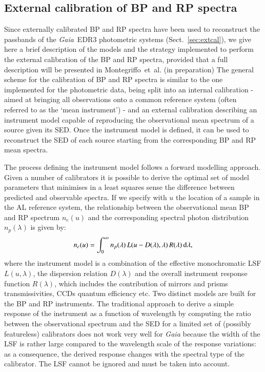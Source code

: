 \documentclass{aa}
\newcommand{\gaia}{\textit{Gaia}\xspace}
\newcommand{\edr}{\gaia~EDR3\xspace}
\newcommand{\xp}{BP and RP\xspace}
\newcommand{\citeip}[1]{#1~et~al. (in preparation)\xspace}
\newcommand{\secname}{Sect.}
\newcommand{\secref}[1]{\secname~\ref{sec:#1}}
\begin{document}

\begin{appendix} %



\section{External calibration of \xp spectra}\label{sec:extxpcal}

Since externally calibrated \xp spectra have been used to reconstruct the passbands of the \edr photometric systems (\secref{extcal}), we give here a brief description of the models and the strategy implemented to perform the external calibration of the \xp spectra, provided that a full description will be presented in \citeip{Montegriffo}
%
The general scheme for the calibration of \xp spectra is similar to the one implemented for the photometric data, being split into an internal calibration - aimed at bringing all observations onto a common reference system (often referred to as the `mean instrument') - and an external calibration describing an instrument model capable of reproducing the observational mean spectrum of a source given its SED. Once the instrument model is defined, it can be used to reconstruct the SED of each source starting from the corresponding \xp mean spectra. 

The process defining the instrument model follows a forward modelling approach.
Given a number of calibrators it is possible to derive the optimal set of model parameters that minimises in a least squares sense the difference between predicted and observable spectra.
If we specify with $u$ the location of a sample in the AL reference system, the relationship between the observational mean \xp spectrum $n_e(u)$ and the corresponding spectral photon distribution $n_p(\lambda)$ is given by:
\begin{equation}
\label{eq:extXpInstrumentModel}
n_{e}(u)=  \int_0^\infty n_p(\lambda) \, L(u - D(\lambda), \lambda) \, R(\lambda) \, {\rm d}\lambda,
\end{equation}
where the instrument model is a combination of the effective monochromatic LSF $L(u, \lambda)$, the dispersion relation $D(\lambda)$ and the overall instrument response function $R(\lambda)$, which includes the contribution of mirrors and prisms transmissivities, CCDs quantum efficiency etc.
Two distinct models are built for the BP and RP instruments.
The traditional approach to derive a simple response of the instrument as a function of wavelength by computing the ratio between the observational spectrum and the SED for a limited set of (possibly featureless) calibrators does not work very well for \gaia because the width of the LSF is rather large compared to the wavelength scale of the response variations: as a consequence, the derived response changes with the spectral type of the calibrator. The LSF cannot be ignored and must be taken into account.


\end{appendix}
\end{document}
